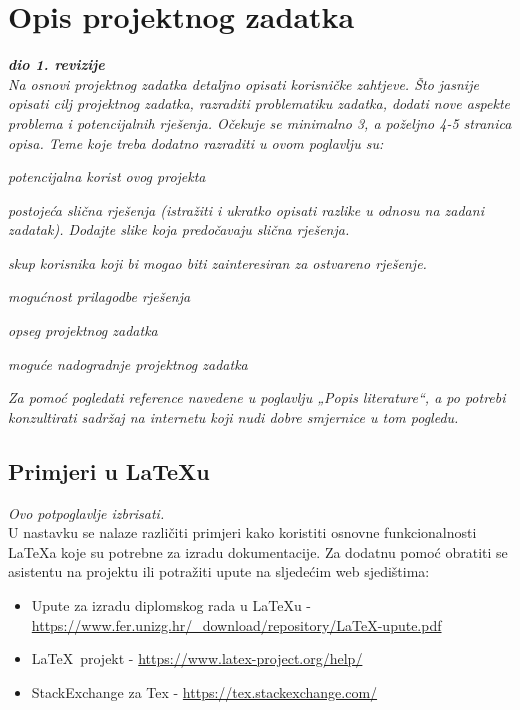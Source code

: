 \chapter{Opis projektnog zadatka}
		
		\textbf{\textit{dio 1. revizije}}\\
		
		\textit{Na osnovi projektnog zadatka detaljno opisati korisničke zahtjeve. Što jasnije opisati cilj projektnog zadatka, razraditi problematiku zadatka, dodati nove aspekte problema i potencijalnih rješenja. Očekuje se minimalno 3, a poželjno 4-5 stranica opisa.	Teme koje treba dodatno razraditi u ovom poglavlju su:}
		\begin{packed_item}
			\item \textit{potencijalna korist ovog projekta}
			\item \textit{postojeća slična rješenja (istražiti i ukratko opisati razlike u odnosu na zadani zadatak). Dodajte slike koja predočavaju slična rješenja.}
			\item \textit{skup korisnika koji bi mogao biti zainteresiran za ostvareno rješenje.}
			\item \textit{mogućnost prilagodbe rješenja }
			\item \textit{opseg projektnog zadatka}
			\item \textit{moguće nadogradnje projektnog zadatka}
		\end{packed_item}
		
		\textit{Za pomoć pogledati reference navedene u poglavlju „Popis literature“, a po potrebi konzultirati sadržaj na internetu koji nudi dobre smjernice u tom pogledu.}
		\eject
		
		\section{Primjeri u \LaTeX u}
		
		\textit{Ovo potpoglavlje izbrisati.}\\

		U nastavku se nalaze različiti primjeri kako koristiti osnovne funkcionalnosti \LaTeX a koje su potrebne za izradu dokumentacije. Za dodatnu pomoć obratiti se asistentu na projektu ili potražiti upute na sljedećim web sjedištima:
		\begin{itemize}
			\item Upute za izradu diplomskog rada u \LaTeX u - \url{https://www.fer.unizg.hr/_download/repository/LaTeX-upute.pdf}
			\item \LaTeX\ projekt - \url{https://www.latex-project.org/help/}
			\item StackExchange za Tex - \url{https://tex.stackexchange.com/}\\
		
		\end{itemize} 	


